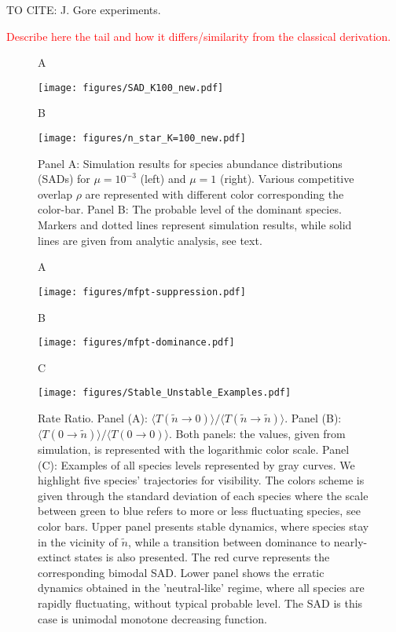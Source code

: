 \documentclass[%
 amsmath,amssymb,
reprint,%
linenumbers]{revtex4-2}
\begin{document}
TO CITE: J. Gore experiments. 



\textcolor{red}{Describe here the tail and how it differs/similarity from the classical derivation.}


\begin{figure}
   \begin{flushleft}
        A
   \end{flushleft}
    \texttt{[image: figures/SAD\_K100\_new.pdf]}
    \begin{flushleft}
        B
   \end{flushleft}
    \texttt{[image: figures/n\_star\_K=100\_new.pdf]}
    \caption{Panel A: Simulation results for species abundance distributions (SADs) for $\mu=10^{-3}$ (left) and $\mu=1$ (right). Various competitive overlap $\rho$ are represented with different color corresponding the color-bar. Panel B: The probable level of the dominant species. Markers and dotted lines represent simulation results, while solid lines are given from analytic analysis, see text.         }
    \label{fig:my_label}
\end{figure}

\begin{figure}
    \centering
    \begin{flushleft}
        A
   \end{flushleft}
   \texttt{[image: figures/mfpt-suppression.pdf]}
   \begin{flushleft}
        B
   \end{flushleft}
    \texttt{[image: figures/mfpt-dominance.pdf]}
    \begin{flushleft}
        C
   \end{flushleft}
    \texttt{[image: figures/Stable\_Unstable\_Examples.pdf]}
    \caption{Rate Ratio. Panel (A):  $\langle T(\tilde{n}\rightarrow 0)\rangle/\langle T(\tilde{n}\rightarrow \tilde{n})\rangle $. Panel (B):  $\langle T(0\rightarrow \tilde{n})\rangle/\langle T(0\rightarrow 0)\rangle $. Both panels: the values, given from simulation, is represented with the logarithmic color scale. Panel (C): Examples of all species levels represented by gray curves.  We highlight five species' trajectories for visibility. The colors scheme is given through the standard deviation of each species where the scale between green to blue refers to more or less fluctuating species, see color bars. Upper panel presents stable dynamics, where species stay in the vicinity of $\tilde{n}$, while a transition between  dominance to nearly-extinct states is also presented. The red curve represents the corresponding bimodal SAD. Lower panel shows the erratic dynamics obtained in the 'neutral-like' regime, where all species are rapidly fluctuating, without typical probable level. The SAD is this case is unimodal monotone decreasing function.   }
    \label{fig:turnover}
\end{figure}
\end{document}
